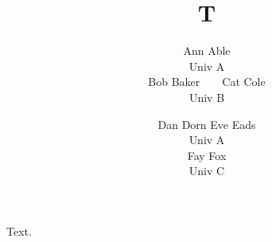 \documentclass{article}
\title{T}
\author{Ann Able \\
Univ A \\
Bob Baker~~~~Cat Cole \\
Univ B
\and Dan Dorn \quad Eve Eads \quad \\
Univ A \\
Fay Fox \\
Univ C}
\begin{document}
\maketitle
Text.
\end{document}
